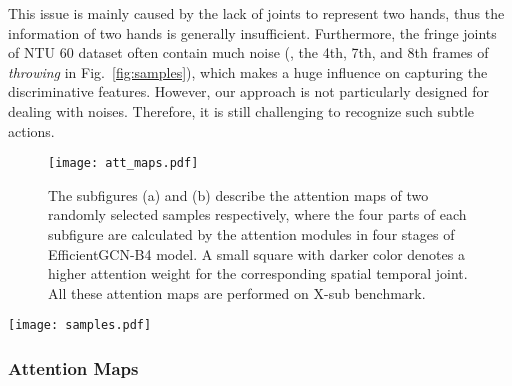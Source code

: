 \documentclass[10pt,journal,compsoc]{IEEEtran}
\begin{document}
This issue is mainly caused by the lack of joints to represent two hands, thus the information of two hands is generally insufficient. Furthermore, the fringe joints of NTU 60 dataset often contain much noise (\eg, the 4th, 7th, and 8th frames of {\it throwing} in Fig.~\ref{fig:samples}), which makes a huge influence on capturing the discriminative features. However, our approach is not particularly designed for dealing with noises. Therefore, it is still challenging to recognize such subtle actions.

\begin{figure}[t]
  \vspace{-0.2cm}
  \centerline{\texttt{[image: att\_maps.pdf]}}
  \vspace{-0.4cm}
  \caption{The subfigures (a) and (b) describe the attention maps of two randomly selected samples respectively, where the four parts of each subfigure are calculated by the attention modules in four stages of EfficientGCN-B4 model. A small square with darker color denotes a higher attention weight for the corresponding spatial temporal joint. All these attention maps are performed on X-sub benchmark. \bv}\label{fig:att_maps}
\end{figure}

\begin{figure*}[t]
  \vspace{-0.2cm}
  \centerline{\texttt{[image: samples.pdf]}}
  \vspace{-0.4cm}
  \caption{Activated joints in 10 contextual frames of EfficientGCN-B4 for the sample actions, \ie, {\it drinking water}, {\it throwing}, {\it taking off a jacket}, {\it waving hand}, and {\it kicking}. The {\color{red}red} points denote the activated joints, while {\color{blue}blue} points represent non-activated joints. \bv}\label{fig:samples}
  \vspace{-0.2cm}
\end{figure*}

\subsubsection{Attention Maps}
\end{document}
